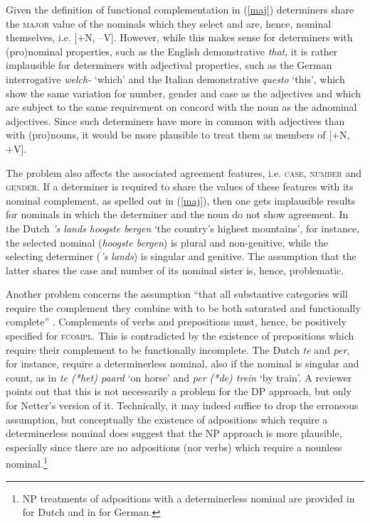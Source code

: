 \documentclass[output=paper
	        ,collection
	        ,collectionchapter
 	        ,biblatex
                ,babelshorthands
                ,newtxmath
                ,draftmode
                ,colorlinks, citecolor=brown
]{langscibook}
\begin{document}
Given the definition of functional complementation in (\ref{maj})
determiners share the \textsc{major} value of the nominals which they select
and are, hence, nominal themselves, i.e. [+N, --V].
However, while this makes sense for determiners with (pro)nominal properties,
such as the English demonstrative \emph{that}, 
it is rather implausible for determiners with adjectival properties,
such as the German interrogative \emph{welch-} `which' and 
the Italian demonstrative \emph{questo} `this', which show the same variation for 
number, gender and case as the adjectives and which are subject to 
the same requirement on concord with the noun as the adnominal adjectives. 
Since such determiners have more in common with adjectives than with (pro)nouns,  
it would be more plausible to treat them as members of [+N, +V].  

The problem also affects the associated agreement features, i.e. \textsc{case}, 
\textsc{number} and \textsc{gender}. If a determiner 
is required to share the values of these features with its nominal complement,
as spelled out in (\ref{maj}), then one gets implausible results for nominals in 
which the determiner and the noun do not show agreement.    
In the Dutch \emph{'s lands hoogste bergen} `the country's highest mountains', 
for instance, the selected nominal (\emph{hoogste bergen}) is plural and non-genitive, 
while the selecting determiner (\emph{'s lands}) is singular and genitive.  
The assumption that the latter shares the case and number of its nominal sister 
is, hence, problematic.

Another problem concerns the assumption ``that all substantive categories will 
require the complement they combine with to be both saturated and functionally complete''
\citep[311]{Netter94}. Complements of verbs and prepositions must, hence, be positively 
specified for \textsc{fcompl}. This is contradicted by the existence of
prepositions which require their complement to be functionally incomplete. 
The Dutch \emph{te} and \emph{per}, for instance, require a determinerless nominal,
also if the nominal is singular and count, as in \emph{te (*het) paard} `on horse' 
and \emph{per (*de) trein} `by train'. A reviewer points out that this is 
not necessarily a problem for the DP approach, but only for Netter's version of it. 
Technically, it may indeed suffice to drop the erroneous assumption, but 
conceptually the existence of adpositions which require a determinerless nominal 
does suggest that the NP approach is more plausible, especially since 
there are no adpositions (nor verbs) which require a nounless nominal.\footnote{NP 
treatments of adpositions with a determinerless nominal are provided in 
\citet{VanEynde04} for Dutch and in \citet{Kiss2008a-u} for German.}    
\end{document}
